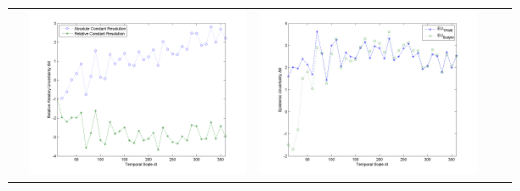 \documentclass[11pt]{article}
\begin{document}
\begin{table}[H]
{\begin{tabular}{c  c   c   c c }
&\begin{minipage}{.4\textwidth}\includegraphics[width=\linewidth]{resultgraph/11025500AU.png}\end{minipage}
&\begin{minipage}{.4\textwidth}\includegraphics[width=\linewidth]{resultgraph/11025500EU.png}\end{minipage}
\\

\end{tabular}}
\end{table}
\end{document}
